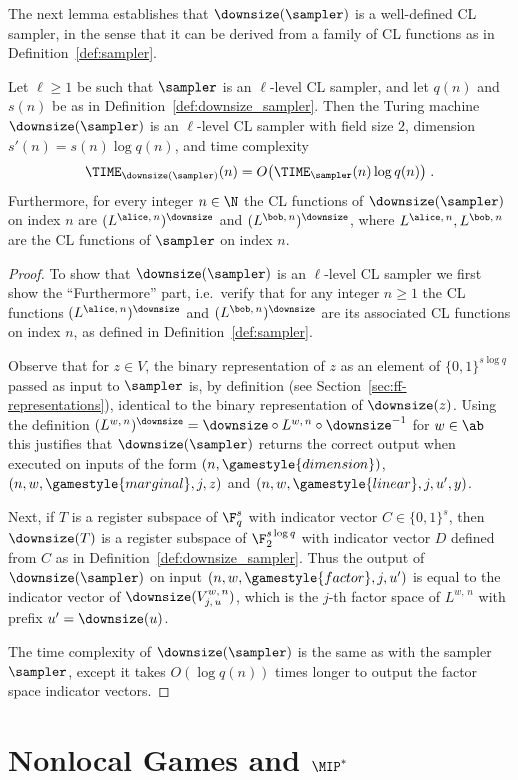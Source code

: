 The next lemma establishes that $\downsize(\sampler)$ is a well-defined CL
sampler, in the sense that it can be derived from a family of CL functions as in
Definition~\ref{def:sampler}.

\begin{lemma}
  \label{lem:downsize_sampler}
  Let $\ell \geq 1$ be such that $\sampler$ is an $\ell$-level CL sampler, and
  let $q(n)$ and $s(n)$ be as in Definition~\ref{def:downsize_sampler}.
  Then the Turing machine $\downsize(\sampler)$ is an $\ell$-level CL sampler
  with field size $2$, dimension $s'(n) = s(n) \log q(n)$, and
  time complexity
  \begin{equation*}
\TIME_{\downsize(\sampler)}(n) = O \bigl( \TIME_\sampler(n) \log q(n) \bigr)\;.
  \end{equation*}
  Furthermore, for every integer $n \in \N$ the CL functions of
  $\downsize(\sampler)$ on index $n$ are $(L^{\alice,\, n})^\downsize$ and
  $(L^{\bob,\, n})^\downsize$, where $L^{\alice,\, n}, L^{\bob,\, n}$ are the CL
  functions of $\sampler$ on index $n$.
\end{lemma}

\begin{proof} 
  To show that $\downsize(\sampler)$ is an $\ell$-level CL sampler we first show
  the ``Furthermore'' part, i.e.\ verify that for any integer $n\geq 1$ the CL
  functions $(L^{\alice,\, n})^\downsize$ and $(L^{\bob,\, n})^\downsize$ are its
  associated CL functions on index $n$, as defined in
  Definition~\ref{def:sampler}.

  Observe that for $z\in V$, the binary representation of $z$ as an element of
  $\{0,1\}^{s\log q}$ passed as input to $\sampler$ is, by definition (see
  Section~\ref{sec:ff-representations}), identical to the binary representation
  of $\downsize(z)$.
  Using the definition $(L^{w,\, n})^\downsize = \downsize \circ L^{w,\, n}
  \circ \downsize^{-1}$ for $w \in \ab$ this justifies that
  $\downsize(\sampler)$ returns the correct output when executed on inputs of
  the form $(n,\gamestyle{dimension})$, $(n,w,\gamestyle{marginal},j,z)$ and
  $(n, w, \gamestyle{linear}, j, u', y)$.

  Next, if $T$ is a register subspace of $\F_q^s$ with indicator vector $C \in
  \{0,1\}^s$, then $\downsize(T)$ is a register subspace of $\F_2^{s\log q}$
  with indicator vector $D$ defined from $C$ as in
  Definition~\ref{def:downsize_sampler}.
  Thus the output of $\downsize(\sampler)$ on input $(n, w, \gamestyle{factor},
  j, u')$ is equal to the indicator vector of $\downsize(V^{w,\, n}_{j,\, u})$,
  which is the $j$-th factor space of $L^{w,\, n}$ with prefix $u' =
  \downsize(u)$.

  The time complexity of $\downsize(\sampler)$ is the same as
  with the sampler $\sampler$, except it takes $O(\log q(n))$ times longer to
  output the factor space indicator vectors.

\end{proof}


 
\section{Nonlocal Games and $\MIP^*$}
